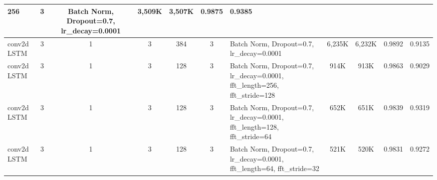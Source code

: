 \documentclass{article}
\begin{document}
\begin{table}
{\begin{tabular} { |m{3cm}|c|c|c|c|c|m{3cm}|c|c|c|c| }
      256 & 3 & Batch Norm, Dropout=0.7, lr\_decay=0.0001 &
      3,509K & 3,507K & 0.9875 & 0.9385 \\ \hline
      conv2d LSTM & 3 & 1 & 3 &
      384 & 3 & Batch Norm, Dropout=0.7, lr\_decay=0.0001 &
      6,235K & 6,232K & 0.9892 & 0.9135 \\ \hline
      \hline
      conv2d LSTM & 3 & 1 & 3 &
      128 & 3 & Batch Norm, Dropout=0.7, lr\_decay=0.0001,
      fft\_length=256, fft\_stride=128 &
      914K & 913K & 0.9863 & 0.9029 \\ \hline
      conv2d LSTM & 3 & 1 & 3 &
      128 & 3 & Batch Norm, Dropout=0.7, lr\_decay=0.0001,
      fft\_length=128, fft\_stride=64 &
      652K & 651K & 0.9839 & 0.9319 \\ \hline
      conv2d LSTM & 3 & 1 & 3 &
      128 & 3 & Batch Norm, Dropout=0.7, lr\_decay=0.0001,
      fft\_length=64, fft\_stride=32 &
      521K & 520K & 0.9831 & 0.9272 \\ \hline
      
    \end{tabular}
  }
\end{table}
\end{document}
